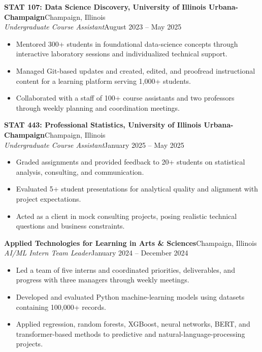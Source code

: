\documentclass[a4paper]{article}
\newcommand{\role}[4]{
    \Needspace{8\baselineskip}
    \vspace{2pt}
    \textbf{#1}\hfill #2\\
    \textit{#3}\hfill #4\\[-3pt]
}
\begin{document}



\role{STAT 107: Data Science Discovery, University of Illinois Urbana-Champaign}{Champaign, Illinois}
{Undergraduate Course Assistant}{August 2023 -- May 2025}
\begin{itemize}[noitemsep]
  \item Mentored 300+ students in foundational data-science concepts through interactive laboratory sessions and individualized technical support.
  \item Managed Git-based updates and created, edited, and proofread instructional content for a learning platform serving 1,000+ students.
  \item Collaborated with a staff of 100+ course assistants and two professors through weekly planning and coordination meetings.
\end{itemize}

\role{STAT 443: Professional Statistics, University of Illinois Urbana-Champaign}{Champaign, Illinois}
{Undergraduate Course Assistant}{January 2025 -- May 2025}
\begin{itemize}[noitemsep]
  \item Graded assignments and provided feedback to 20+ students on statistical analysis, consulting, and communication.
  \item Evaluated 5+ student presentations for analytical quality and alignment with project expectations.
  \item Acted as a client in mock consulting projects, posing realistic technical questions and business constraints.
\end{itemize}

\role{Applied Technologies for Learning in Arts \& Sciences}{Champaign, Illinois}
{AI/ML Intern Team Leader}{January 2024 -- December 2024}
\begin{itemize}[noitemsep]
  \item Led a team of five interns and coordinated priorities, deliverables, and progress with three managers through weekly meetings.
  \item Developed and evaluated Python machine-learning models using datasets containing 100,000+ records.
  \item Applied regression, random forests, XGBoost, neural networks, BERT, and transformer-based methods to predictive and natural-language-processing projects.
\end{itemize}
\end{document}
